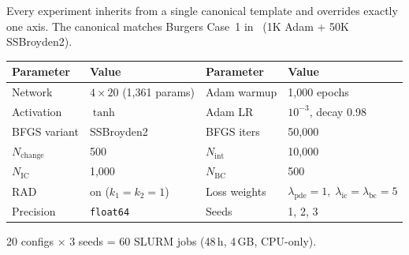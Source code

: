 \documentclass[11pt,a4paper]{article}
\begin{document}
Every experiment inherits from a single canonical template and overrides exactly one axis.
The canonical matches Burgers Case~1 in~\cite{kiyani2025} (1K Adam + 50K SSBroyden2).

\begin{center}
\small
\begin{tabular}{@{}ll@{\qquad}ll@{}}
\toprule
\textbf{Parameter} & \textbf{Value} & \textbf{Parameter} & \textbf{Value} \\
\midrule
Network        & $4\times20$ (1,361 params) & Adam warmup  & 1,000 epochs \\
Activation     & $\tanh$                    & Adam LR      & $10^{-3}$, decay 0.98 \\
BFGS variant   & SSBroyden2                 & BFGS iters   & 50,000 \\
$N_\text{change}$ & 500                     & $N_\text{int}$ & 10,000 \\
$N_\text{IC}$  & 1,000                      & $N_\text{BC}$  & 500 \\
RAD            & on ($k_1\!=\!k_2\!=\!1$)   & Loss weights & $\lambda_\text{pde}\!=\!1,\;\lambda_\text{ic}\!=\!\lambda_\text{bc}\!=\!5$ \\
Precision      & \texttt{float64}           & Seeds         & 1, 2, 3 \\
\bottomrule
\end{tabular}
\end{center}

\vspace{0.3em}

20 configs $\times$ 3 seeds = 60 SLURM jobs (48\,h, 4\,GB, CPU-only).
\end{document}
